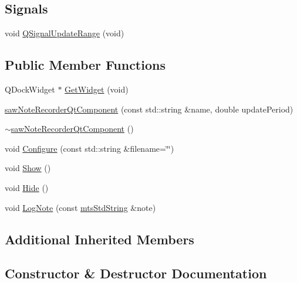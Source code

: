\subsection*{Signals}
\begin{DoxyCompactItemize}
\item 
void \hyperlink{classsaw_note_recorder_qt_component_a2d912cf45c405aa577dff2a2debb22c1}{Q\+Signal\+Update\+Range} (void)
\end{DoxyCompactItemize}
\subsection*{Public Member Functions}
\begin{DoxyCompactItemize}
\item 
Q\+Dock\+Widget $\ast$ \hyperlink{classsaw_note_recorder_qt_component_a0270c27baaa6259bd9eac3be867b5d1a}{Get\+Widget} (void)
\item 
\hyperlink{classsaw_note_recorder_qt_component_abbd0f321c7abb67ce72d877707ecb38f}{saw\+Note\+Recorder\+Qt\+Component} (const std\+::string \&name, double update\+Period)
\item 
\hyperlink{classsaw_note_recorder_qt_component_a2626675183bd2287aa87b17362857a7f}{$\sim$saw\+Note\+Recorder\+Qt\+Component} ()
\item 
void \hyperlink{classsaw_note_recorder_qt_component_a11d04fea3bde8e8f2a918ac1efa3306f}{Configure} (const std\+::string \&filename=\char`\"{}\char`\"{})
\item 
void \hyperlink{classsaw_note_recorder_qt_component_ae8117d1f54c12aa799081ccbdddbfbbc}{Show} ()
\item 
void \hyperlink{classsaw_note_recorder_qt_component_af6b2b5f0cd3f81623385ad7f58d1efe0}{Hide} ()
\item 
void \hyperlink{classsaw_note_recorder_qt_component_a9c635636528fdcee50f97f7c4bff4996}{Log\+Note} (const \hyperlink{mts_generic_object_proxy_8h_adbc21bfbf98367e582bf8a263b7e711f}{mts\+Std\+String} \&note)
\end{DoxyCompactItemize}
\subsection*{Additional Inherited Members}


\subsection{Constructor \& Destructor Documentation}
\hypertarget{classsaw_note_recorder_qt_component_abbd0f321c7abb67ce72d877707ecb38f}{}
